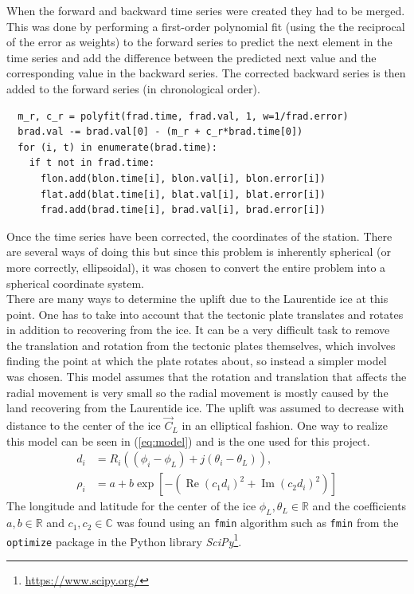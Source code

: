 \documentclass[12pt,a4paper]{article}
\begin{document}
When the forward and backward time series were created they had to be merged.
This was done by performing a first-order polynomial fit (using the the reciprocal of the error as weights) to the forward series to predict the next element in the time series and add the difference between the predicted next value and the corresponding value in the backward series.
The corrected backward series is then added to the forward series (in chronological order).

\begin{lstlisting}
  m_r, c_r = polyfit(frad.time, frad.val, 1, w=1/frad.error)
  brad.val -= brad.val[0] - (m_r + c_r*brad.time[0])
  for (i, t) in enumerate(brad.time):
    if t not in frad.time:
      flon.add(blon.time[i], blon.val[i], blon.error[i])
      flat.add(blat.time[i], blat.val[i], blat.error[i])
      frad.add(brad.time[i], brad.val[i], brad.error[i])
\end{lstlisting}

Once the time series have been corrected, the coordinates of the station.
There are several ways of doing this but since this problem is inherently spherical (or more correctly, ellipsoidal), it was chosen to convert the entire problem into a spherical coordinate system.\\

\noindent There are many ways to determine the uplift due to the Laurentide ice at this point.
One has to take into account that the tectonic plate translates and rotates in addition to recovering from the ice.
It can be a very difficult task to remove the translation and rotation from the tectonic plates themselves, which involves finding the point at which the plate rotates about, so instead a simpler model was chosen.
This model assumes that the rotation and translation that affects the radial movement is very small so the radial movement is mostly caused by the land recovering from the Laurentide ice.
The uplift was assumed to decrease with distance to the center of the ice $\vec{C}_L$ in an elliptical fashion.
One way to realize this model can be seen in (\ref{eq:model}) and is the one used for this project.
\begin{align}
  \label{eq:model}
  d_i & = R_i((\phi_i-\phi_L) + j(\theta_i-\theta_L)), \nonumber \\
  \rho_i & = a + b\exp[-(\operatorname{Re}{(c_1d_i)}^2 + \operatorname{Im}{(c_2d_i)}^2)]
\end{align}
The longitude and latitude for the center of the ice $\phi_L, \theta_L \in \mathbb{R}$ and the coefficients $a, b \in \mathbb{R}$ and $c_1, c_2 \in \mathbb{C}$ was found using an \texttt{fmin} algorithm such as \texttt{fmin} from the \texttt{optimize} package in the Python library \textit{SciPy}\footnote{\url{https://www.scipy.org/}}.
\end{document}
